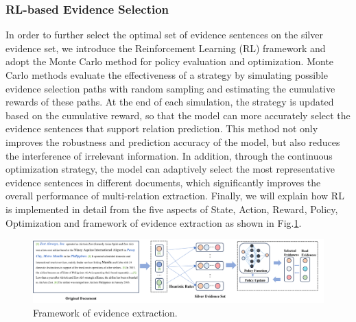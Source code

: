 \documentclass[preprint,12pt]{elsarticle}
\begin{document}
\subsubsection{RL-based Evidence Selection}\label{subsubsec6}
In order to further select the optimal set of evidence sentences on the silver evidence set, we introduce the Reinforcement Learning (RL) framework and adopt the Monte Carlo method for policy evaluation and optimization. Monte Carlo methods evaluate the effectiveness of a strategy by simulating possible evidence selection paths with random sampling and estimating the cumulative rewards of these paths. At the end of each simulation, the strategy is updated based on the cumulative reward, so that the model can more accurately select the evidence sentences that support relation prediction. This method not only improves the robustness and prediction accuracy of the model, but also reduces the interference of irrelevant information. In addition, through the continuous optimization strategy, the model can adaptively select the most representative evidence sentences in different documents, which significantly improves the overall performance of multi-relation extraction. Finally, we will explain how RL is implemented in detail from the five aspects of State, Action, Reward, Policy, Optimization and framework of evidence extraction as shown in Fig.\ref{fig.5}.

\begin{figure}[htbp]
\centering
\includegraphics[width=5.5in]{./RL.png}
\caption{ Framework of evidence extraction.}
\label{fig.5}
\end{figure}
\end{document}
